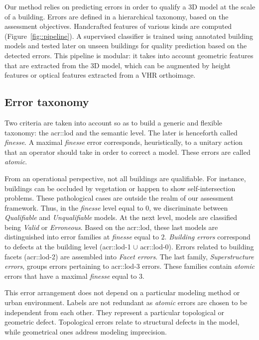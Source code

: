 \documentclass[conference]{IEEEtran}
\begin{document}
Our method relies on predicting errors in order to qualify a 3D model at the scale of a building. Errors are defined in a hierarchical taxonomy, based on the assessment objectives. Handcrafted features of various kinds are computed (Figure~\ref{fig::pipeline}). A supervised classifier is trained using annotated building models and tested later on unseen buildings for quality prediction based on the detected errors. This pipeline is modular: it takes into account geometric features that are extracted from the 3D model, which can be augmented by height features or optical features extracted from a VHR orthoimage.

\subsection{Error taxonomy}
	Two criteria are taken into account so as to build a generic and flexible taxonomy: the \acrshort{acr::lod} and the semantic level. The later is henceforth called \textit{finesse}. A maximal \textit{finesse} error corresponds, heuristically, to a unitary action that an operator should take in order to correct a model. These errors are called \textit{atomic}.
    
    From an operational perspective, not all buildings are qualifiable. For instance, buildings can be occluded by vegetation or happen to show self-intersection problems. These pathological cases are outside the realm of our assessment framework. Thus, in the \textit{finesse} level equal to $0$, we discriminate between \textit{Qualifiable} and \textit{Unqualifiable} models. At the next level, models are classified being \textit{Valid} or \textit{Erroneous}. Based on the \acrshort{acr::lod}, these last models are distinguished into error families at \textit{finesse} equal to $2$. \textit{Building errors} correspond to defects at the building level (\acrshort{acr::lod}-1 $\cup$ \acrshort{acr::lod}-0). Errors related to building facets (\acrshort{acr::lod}-2) are assembled into \textit{Facet errors}. The last family, \textit{Superstructure errors}, groups errors pertaining to \acrshort{acr::lod}-3 errors. These families contain \textit{atomic} errors that have a maximal \textit{finesse} equal to $3$.
    
    This error arrangement does not depend on a particular modeling method or urban environment. Labels are not redundant as \textit{atomic} errors are chosen to be independent from each other. They represent a particular topological or geometric defect. Topological errors relate to structural defects in the model, while geometrical ones address modeling imprecision. 
    
\end{document}
